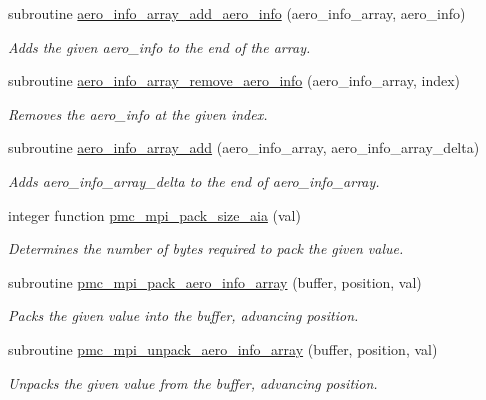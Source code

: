 \begin{DoxyCompactItemize}
subroutine \mbox{\hyperlink{namespacepmc__aero__info__array_a6a9a944a44aa3d2baf2442c9d90648b3}{aero\+\_\+info\+\_\+array\+\_\+add\+\_\+aero\+\_\+info}} (aero\+\_\+info\+\_\+array, aero\+\_\+info)
\begin{DoxyCompactList}\small\item\em Adds the given aero\+\_\+info to the end of the array. \end{DoxyCompactList}\item 
subroutine \mbox{\hyperlink{namespacepmc__aero__info__array_a60ce5d65642024604428bd7a6764ac70}{aero\+\_\+info\+\_\+array\+\_\+remove\+\_\+aero\+\_\+info}} (aero\+\_\+info\+\_\+array, index)
\begin{DoxyCompactList}\small\item\em Removes the aero\+\_\+info at the given index. \end{DoxyCompactList}\item 
subroutine \mbox{\hyperlink{namespacepmc__aero__info__array_a40802e262efd0945b1bf37cf548b4bb3}{aero\+\_\+info\+\_\+array\+\_\+add}} (aero\+\_\+info\+\_\+array, aero\+\_\+info\+\_\+array\+\_\+delta)
\begin{DoxyCompactList}\small\item\em Adds {\ttfamily aero\+\_\+info\+\_\+array\+\_\+delta} to the end of {\ttfamily aero\+\_\+info\+\_\+array}. \end{DoxyCompactList}\item 
integer function \mbox{\hyperlink{namespacepmc__aero__info__array_a80e0fdcb7ccd8fde3594259863523ed9}{pmc\+\_\+mpi\+\_\+pack\+\_\+size\+\_\+aia}} (val)
\begin{DoxyCompactList}\small\item\em Determines the number of bytes required to pack the given value. \end{DoxyCompactList}\item 
subroutine \mbox{\hyperlink{namespacepmc__aero__info__array_a7991a20a1777310cb3eff21efc188a99}{pmc\+\_\+mpi\+\_\+pack\+\_\+aero\+\_\+info\+\_\+array}} (buffer, position, val)
\begin{DoxyCompactList}\small\item\em Packs the given value into the buffer, advancing position. \end{DoxyCompactList}\item 
subroutine \mbox{\hyperlink{namespacepmc__aero__info__array_a1439690489e5c170ecc3b85db4f6cbd4}{pmc\+\_\+mpi\+\_\+unpack\+\_\+aero\+\_\+info\+\_\+array}} (buffer, position, val)
\begin{DoxyCompactList}\small\item\em Unpacks the given value from the buffer, advancing position. \end{DoxyCompactList}\end{DoxyCompactItemize}



